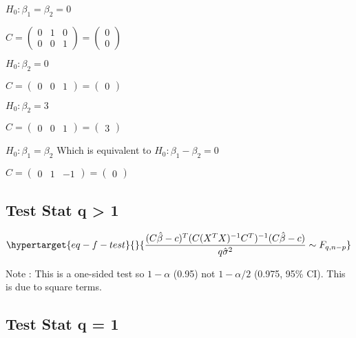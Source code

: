 \documentclass[
  letterpaper,
  DIV=11,
  numbers=noendperiod]{scrreprt}
\begin{document}
\hfill\break

\(H_0 : \beta_1 = \beta_2 = 0\)

\(C = \begin{pmatrix} 0 & 1 & 0\\ 0 & 0 & 1 \end{pmatrix} = \begin{pmatrix} 0 \\ 0 \end{pmatrix}\)

\hfill\break

\(H_0 : \beta_2 = 0\)

\(C = \begin{pmatrix} 0 & 0 & 1 \end{pmatrix} = \begin{pmatrix} 0 \end{pmatrix}\)

\hfill\break

\(H_0 : \beta_2 = 3\)

\(C = \begin{pmatrix} 0 & 0 & 1 \end{pmatrix} = \begin{pmatrix} 3 \end{pmatrix}\)

\hfill\break

\(H_0 : \beta_1 = \beta_2\) Which is equivalent to
\(H_0 : \beta_1 - \beta_2 = 0\)

\(C = \begin{pmatrix} 0 & 1 & -1 \end{pmatrix} = \begin{pmatrix} 0 \end{pmatrix}\)

\hypertarget{test-stat-q-1}{%
\subsection{Test Stat q \textgreater{} 1}\label{test-stat-q-1}}

\begin{equation}\protect\hypertarget{eq-f-test}{}{\frac{(C \hat{\beta} -c )^T(C(X^TX)^{-1}C^T)^{-1}(C \hat{\beta} -c )}{q\hat{\sigma}^2} \sim F_{q, n-p}}\label{eq-f-test}\end{equation}

Note : This is a one-sided test so \(1-\alpha\) (0.95) not
\(1-\alpha / 2\) (0.975, 95\% CI). This is due to square terms.

\hypertarget{test-stat-q-1-1}{%
\subsection{Test Stat q = 1}\label{test-stat-q-1-1}}
\end{document}
